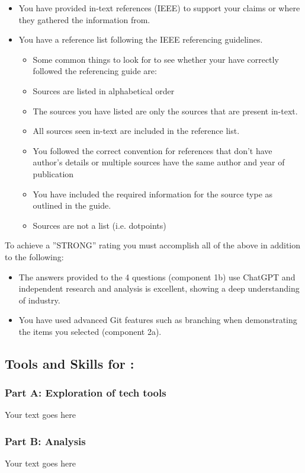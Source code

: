 \documentclass[a4paper, 11pt]{report}
\begin{document}
{\begin{itemize}
\begin {itemize}
	\item You have provided in-text references (IEEE) to support your claims or where they gathered the information from.
	\item You have a reference list following the IEEE referencing guidelines.
		\begin{itemize}
		\item Some common things to look for to see whether your have correctly followed the referencing guide are:
		\item Sources are listed in alphabetical order
		\item The sources you have listed are only the sources that are present in-text.
		\item All sources seen in-text are included in the reference list.
		\item You followed the correct convention for references that don’t have author’s details or multiple sources have the same author and year of publication
		\item You have included the required information for the source type as outlined in the guide.
		\item Sources are not a list (i.e. dotpoints)
		\end{itemize}
	\end{itemize}
\end{itemize}
To achieve a ''STRONG'' rating you must accomplish all of the above in addition to the following:
\begin{itemize}
\item The answers provided to the 4 questions (component 1b) use ChatGPT and independent research and analysis is excellent, showing a deep understanding of industry.
\item You have used advanced Git features such as branching when demonstrating the items you selected (component 2a).
\end{itemize}
\subsection{Tools and Skills for \majA: \studA}
\subsubsection{Part A: Exploration of tech tools}
Your text goes here
\subsubsection{Part B: Analysis}
Your text goes here
}
\end{document}
